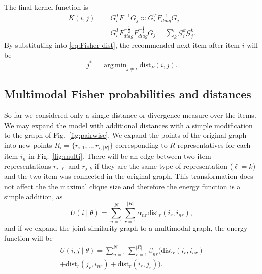 \documentclass[preprint]{sig-alternate-05-2015}
\DeclareMathOperator*{\argmin}{arg\,min}
\begin{document}
The final kernel function is
%
\begin{equation}
\begin{split}
K(i,j) &= G_i^T F^{-1} G_j \approx G_i^T F_{diag}^{-1} G_j \\
	   &= G_i^T F_{diag}^{-\frac 12} F_{diag}^{-\frac 12} G_j = \sum_k \mathcal{G}_i^k \mathcal{G}_j^k.
\end{split}
\nonumber
\end{equation}
By substituting into \eqref{eq:Fisher-dist}, the recommended next item after item $i$ will be
%
\begin{equation}
j^{*} = \argmin_{j \neq i} \text{dist}_F(i,j).
\nonumber 
\end{equation}

\subsection{Multimodal Fisher probabilities and distances}
\label{sec:fish_comb}

So far we considered only a single distance or divergence measure over the items. We may expand the model with additional distances with a simple modification to the graph of Fig.~\ref{fig:pairwise}. 
We expand the points of the original graph into new points $R_i=\{r_{i,1},..,r_{i,|R|}\}$ corresponding to $R$ representatives for each item $i_n$ in Fig.~\ref{fig:multi}. There will be an edge between two item representations $r_{i,\ell}$ and $r_{j,k}$ if they are the same type of representation ($\ell=k$) and the two item was connected in the original graph. This transformation does not affect the the maximal clique size and therefore the energy function is a simple addition, as
%
\begin{equation}
U(i \mid \theta) = \sum_{n=1}^{N} \sum_{r=1}^{|R|} \alpha_{nr} \mbox{dist}_r(i_r,i_{nr}),
\label{eq:potential_multi}
\end{equation}
% 
and if we expand the joint similarity graph to a multimodal graph, the energy function will be
%
\begin{equation}
\begin{split}
\label{eq:potential_joined_multi}
U(i,j \mid \theta) = \sum_{n=1}^{N} \sum_{r=1}^{|R|} \beta_{nr} (\mbox{dist}_r(i_r,i_{nr}) \\
+ \mbox{dist}_r(j_r,i_{nr}) + \mbox{dist}_r(i_r,j_r)).
\end{split}
\end{equation}
\end{document}
